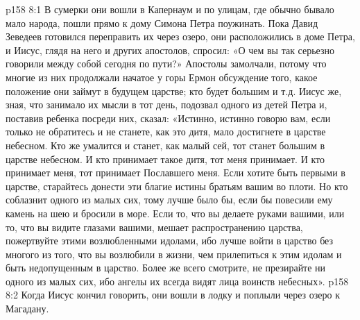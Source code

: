 \vs p158 8:1 В сумерки они вошли в Капернаум и по улицам, где обычно бывало мало народа, пошли прямо к дому Симона Петра поужинать. Пока Давид Зеведеев готовился переправить их через озеро, они расположились в доме Петра, и Иисус, глядя на него и других апостолов, спросил: «О чем вы так серьезно говорили между собой сегодня по пути?» Апостолы замолчали, потому что многие из них продолжали начатое у горы Ермон обсуждение того, какое положение они займут в будущем царстве; кто будет большим и т.д. Иисус же, зная, что занимало их мысли в тот день, подозвал одного из детей Петра и, поставив ребенка посреди них, сказал: «Истинно, истинно говорю вам, если только не обратитесь и не станете, как это дитя, мало достигнете в царстве небесном. Кто же умалится и станет, как малый сей, тот станет большим в царстве небесном. И кто принимает такое дитя, тот меня принимает. И кто принимает меня, тот принимает Пославшего меня. Если хотите быть первыми в царстве, старайтесь донести эти благие истины братьям вашим во плоти. Но кто соблазнит одного из малых сих, тому лучше было бы, если бы повесили ему камень на шею и бросили в море. Если то, что вы делаете руками вашими, или то, что вы видите глазами вашими, мешает распространению царства, пожертвуйте этими возлюбленными идолами, ибо лучше войти в царство без многого из того, что вы возлюбили в жизни, чем прилепиться к этим идолам и быть недопущенным в царство. Более же всего смотрите, не презирайте ни одного из малых сих, ибо ангелы их всегда видят лица воинств небесных».
\vs p158 8:2 Когда Иисус кончил говорить, они вошли в лодку и поплыли через озеро к Магадану.
